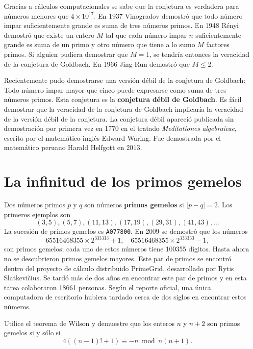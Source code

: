 Gracias a cálculos computacionales se sabe que la conjetura es verdadera para
números menores que $4\times 10^{17}$. En 1937 Vinogradov demostró que todo
número impar suficientemente grande es suma de tres números primos. En 1948
Rényi demostró que existe un entero $M$ tal que cada número impar $n$
suficientemente grande es suma de un primo y otro número que tiene a lo sumo
$M$ factores primos. Si alguien pudiera demostrar que $M=1$, se tendría
entonces la veracidad de la conjetura de Goldbach. En 1966 Jing-Run demostró
que $M\leq 2$. 

Recientemente pudo demostrarse una versión débil de la conjetura de Goldbach:
Todo número impar mayor que cinco puede expresarse como suma de tres números
primos.  Esta conjetura es la \textbf{conjetura débil de Goldbach}. Es fácil
demostrar que la veracidad de la conjetura de Goldbach implicaría la veracidad
de la versión débil de la conjetura.  La conjetura débil apareció publicada sin
demostración por primera vez en 1770 en el tratado \emph{Meditationes
algebraicae}, escrito por el matemático inglés Edward Waring. Fue demostrada
por el matemático peruano Harald Helfgott en 2013. 

\section*{La infinitud de los primos gemelos}

Dos números primos $p$ y $q$ son números \textbf{primos gemelos} si $|p-q|=2$.
Los primeros ejemplos son
\[
	(3, 5), (5, 7), (11, 13), (17, 19), (29, 31), (41, 43),\dots
\]
La sucesión de primos gemelos es \verb+A077800+.  
En 2009 se demostró que los números 
\[
	65516468355\times 2^{333333}+1,
	\quad
	65516468355\times 2^{333333}-1,
\]
son primos gemelos; cada uno de estos números tiene 100355 dígitos.  Hasta
ahora no se descubrieron primos gemelos mayores. Este par de primos se encontró
dentro del proyecto de cálculo distribuido PrimeGrid, desarrollado por Rytis
Slatkevi\v{c}ius.  Se tardó más de dos años en encontrar este par de primos y
en esta tarea colaboraron 18661 personas. Según el reporte oficial, una única
computadora de escritorio hubiera tardado cerca de dos siglos en encontrar
estos números.

\begin{exercise}
	Utilice el teorema de Wilson y 
	demuestre que los enteros $n$ y $n+2$ son primos gemelos si y sólo si
	\[
		4( (n-1)!+1)\equiv -n\bmod{n(n+1)}.
	\]
\end{exercise}

